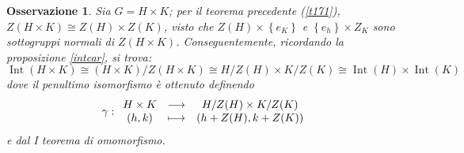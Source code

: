 \documentclass[11pt]{scrartcl}
\theoremstyle{style1}
\newtheorem{osservazione}{Osservazione}[section]
\numberwithin{equation}{subsection}
\begin{document}
\begin{osservazione}
	Sia $G = H \times K$; per il teorema precedente (\ref{t171}), $Z(H \times  K) \cong Z(H) \times Z(K)$, visto che $Z(H) \times \left\{ e_K \right\} $ e $\left\{ e_h \right\} \times Z_K$ sono sottogruppi normali di $Z(H\times K)$.
	Conseguentemente, ricordando la proposizione \ref{intcar}, si trova:
	\[
	\operatorname{Int} (H \times K) \cong (H\times K )/ Z(H\times K)\cong H / Z(H) \times K / Z(K)\cong \operatorname{Int} (H) \times \operatorname{Int} (K)
	\] 
	dove il penultimo isomorfismo \`e ottenuto definendo
	\[
	\gamma :
	\begin{array}
		{c c c}
		H \times K & \longrightarrow &H / Z(H) \times K / Z(K)\\
		(h,k) & \longmapsto & \left(h + Z(H) , k + Z(K)\right) 
	\end{array}
	\] 
	e dal I teorema di omomorfismo.
\end{osservazione}
\end{document}
